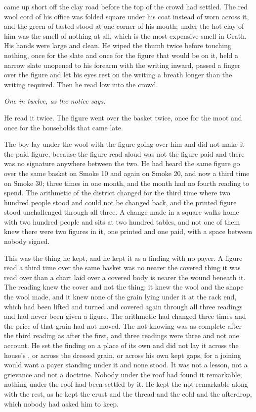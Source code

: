  came up short off the clay road before the top of the crowd had settled. The red wool cord of his office was folded square under his coat instead of worn across it, and the green of tasted  stood at one corner of his mouth; under the hot clay of him was the smell of nothing at all, which is the most expensive smell in Grath. His hands were large and clean. He wiped the thumb twice before touching nothing, once for the slate and once for the figure that would be on it, held a narrow slate unopened to his forearm with the writing inward, passed a finger over the figure and let his eyes rest on the writing a breath longer than the writing required. Then he read low into the crowd.

\emph{One in twelve, as the notice says.}

He read it twice. The figure went over the basket twice, once for the moot and once for the households that came late.

The boy lay under the wool with the figure going over him and did not make it the paid figure, because the figure read aloud was not the figure paid and there was no signature anywhere between the two. He had heard the same figure go over the same basket on Smoke 10 and again on Smoke 20, and now a third time on Smoke 30; three times in one month, and the month had no fourth reading to spend. The arithmetic of the district changed for the third time where two hundred people stood and could not be changed back, and the printed figure stood unchallenged through all three. A change made in a square walks home with two hundred people and sits at two hundred tables, and not one of them knew there were two figures in it, one printed and one paid, with a space between nobody signed.

This was the thing he kept, and he kept it as a finding with no payer. A figure read a third time over the same basket was no nearer the covered thing it was read over than a chart laid over a covered body is nearer the wound beneath it. The reading knew the cover and not the thing; it knew the wool and the shape the wool made, and it knew none of the grain lying under it at the rack end, which had been lifted and turned and covered again through all three readings and had never been given a figure. The arithmetic had changed three times and the price of that grain had not moved. The not-knowing was as complete after the third reading as after the first, and three readings were three and not one account. He set the finding on a place of its own and did not lay it across the house's , or across the dressed grain, or across his own kept gaps, for a joining would want a payer standing under it and none stood. It was not a lesson, not a grievance and not a doctrine. Nobody under the roof had found it remarkable; nothing under the roof had been settled by it. He kept the not-remarkable along with the rest, as he kept the crust and the thread and the cold and the afterdrop, which nobody had asked him to keep.

